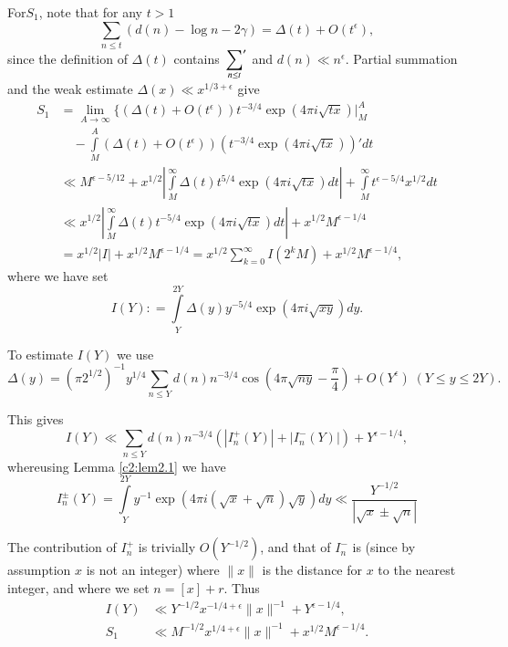 For\pageoriginale $S_1$, note that for any $t> 1$
$$
\sum_{n \leq t} (d(n) - \log n - 2 \gamma) = \Delta  (t) + O (t^\epsilon),
$$
since the definition of $\Delta  (t)$ contains
$\displaystyle{\sideset{}{'}\sum_{n \leq t}}$ and $d(n) \ll
n^\epsilon$. Partial summation and the weak estimate $\Delta  (x)
\ll x^{1/3+ \epsilon}$ give
\begin{align*}
  S_1 & = \lim\limits_{A \to \infty} \Bigg\{ (\Delta  (t) +
  O(t^\epsilon)) t^{- 3/4} \exp (4 \pi i \sqrt{tx})\bigg|_M^A \\
  & \quad - \int\limits_M^A (\Delta  (t) + O(t^\epsilon)) (t^{-3/4} \exp (4
  \pi i \sqrt{tx}))' dt\\
  & \ll M^{\epsilon- 5/12} + x^{1/2} \left|\int\limits_M^\infty
  \Delta  (t) t^{5/4} \exp (4 \pi i \sqrt{tx})dt \right| +
  \int\limits_M^\infty t^{\epsilon- 5/4} x^{1/2}dt\\
  & \ll x^{1/2} \left|\int\limits_M^\infty \Delta  (t) t^{- 5/4} \exp
  (4 \pi i \sqrt{tx})dt \right| + x^{1/2} M^{\epsilon - 1/4}\\
  & = x^{1/2} |I| + x^{1/2} M^{\epsilon - 1/4} = x^{1/2}
  \sum_{k=0}^\infty I (2^k M) + x^{1/2} M^{\epsilon - 1/4},
\end{align*}
where we have set
$$
I(Y) : = \int\limits_Y^{2Y} \Delta  (y)y^{-5/4} \exp (4 \pi i
\sqrt{xy})dy. 
$$

To estimate $I(Y)$ we use
{\fontsize{10}{12}\selectfont
$$
\Delta  (y) = (\pi 2^{1/2})^{-1} y^{1/4} \sum_{n \leq Y} d(n)
n^{-3/4} \cos \left(4 \pi \sqrt{ny} - \frac{\pi}{4}\right) +
O (Y^\epsilon)  \; (Y \leq y \leq 2 Y).
$$}

This gives 
$$
I(Y) \ll \sum_{n \leq Y} d(n) n^{-3/4} \left(|I_n^+ (Y)| + |I_n^-
(Y)|\right) + Y^{\epsilon- 1/4},
$$
where\pageoriginale using Lemma \ref{c2:lem2.1} we have
$$
I_n^{\pm} (Y) = \int\limits_Y^{2Y} y^{-1} \exp (4 \pi i (\sqrt{x} +
\sqrt{n}) \sqrt{y}) dy \ll \frac{Y^{-1/2}}{|\sqrt{x} \pm \sqrt{n}|}
$$

The contribution of $I_n^+$ is trivially $O(Y^{-1/2})$, and that of
$I_n^-$ is (since by assumption $x$ is not an integer)
{}
where $\parallel x\parallel$ is the distance for $x$ to the nearest
integer, and where we set $n = [x] + r$. Thus
\begin{align*}
  I(Y) & \ll Y^{-1/2} x^{-1/4 + \epsilon} \parallel x \parallel^{-1} +
    Y^{\epsilon - 1/4},\\
    S_1 &  \ll M^{-1/2} x^{1/4+\epsilon} \parallel x\parallel^{-1} +
    x^{1/2} M^{\epsilon- 1/4}.
\end{align*}

